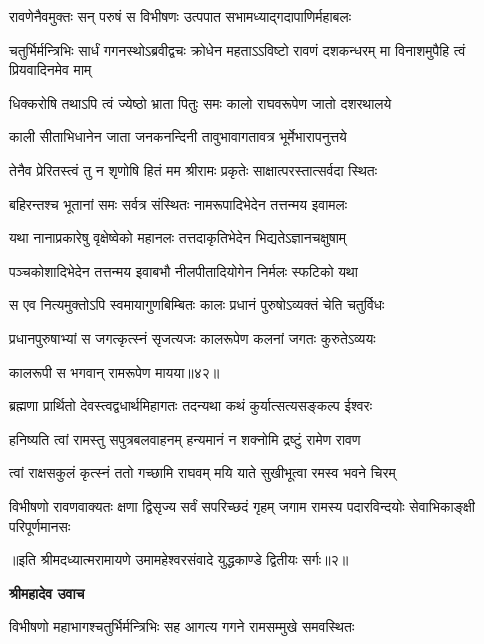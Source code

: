 \twolineshloka
{रावणेनैवमुक्तः सन् परुषं स विभीषणः}
{उत्पपात सभामध्याद्गदापाणिर्महाबलः} %

\threelineshloka
{चतुर्भिर्मन्त्रिभिः सार्धं गगनस्थोऽब्रवीद्वचः}
{क्रोधेन महताऽऽविष्टो रावणं दशकन्धरम्}
{मा विनाशमुपैहि त्वं प्रियवादिनमेव माम्} %

\twolineshloka
{धिक्करोषि तथाऽपि त्वं ज्येष्ठो भ्राता पितुः समः}
{कालो राघवरूपेण जातो दशरथालये} %

\twolineshloka
{काली सीताभिधानेन जाता जनकनन्दिनी}
{तावुभावागतावत्र भूर्मेभारापनुत्तये} %

\twolineshloka
{तेनैव प्रेरितस्त्वं तु न शृणोषि हितं मम}
{श्रीरामः प्रकृतेः साक्षात्परस्तात्सर्वदा स्थितः} %

\twolineshloka
{बहिरन्तश्च भूतानां समः सर्वत्र संस्थितः}
{नामरूपादिभेदेन तत्तन्मय इवामलः} %

\twolineshloka
{यथा नानाप्रकारेषु वृक्षेष्वेको महानलः}
{तत्तदाकृतिभेदेन भिद्यतेऽज्ञानचक्षुषाम्} %

\twolineshloka
{पञ्चकोशादिभेदेन तत्तन्मय इवाबभौ}
{नीलपीतादियोगेन निर्मलः स्फटिको यथा} %

\twolineshloka
{स एव नित्यमुक्तोऽपि स्वमायागुणबिम्बितः}
{कालः प्रधानं पुरुषोऽव्यक्तं चेति चतुर्विधः} %

\twolineshloka
{प्रधानपुरुषाभ्यां स जगत्कृत्स्नं सृजत्यजः}
{कालरूपेण कलनां जगतः कुरुतेऽव्ययः} %

{कालरूपी स भगवान् रामरूपेण मायया॥४२॥} %


\twolineshloka
{ब्रह्मणा प्रार्थितो देवस्त्वद्वधार्थमिहागतः}
{तदन्यथा कथं कुर्यात्सत्यसङ्कल्प ईश्वरः} %

\twolineshloka
{हनिष्यति त्वां रामस्तु सपुत्रबलवाहनम्}
{हन्यमानं न शक्नोमि द्रष्टुं रामेण रावण} %

\twolineshloka
{त्वां राक्षसकुलं कृत्स्नं ततो गच्छामि राघवम्}
{मयि याते सुखीभूत्वा रमस्व भवने चिरम्} %

\fourlineindentedshloka
{विभीषणो रावणवाक्यतः क्षणा\-}
{द्विसृज्य सर्वं सपरिच्छदं गृहम्}
{जगाम रामस्य पदारविन्दयोः}
{सेवाभिकाङ्क्षी परिपूर्णमानसः} %

{॥इति श्रीमदध्यात्मरामायणे उमामहेश्वरसंवादे युद्धकाण्डे द्वितीयः
सर्गः॥२॥
}




\textbf{श्रीमहादेव उवाच}

\twolineshloka
{विभीषणो महाभागश्चतुर्भिर्मन्त्रिभिः सह}
{आगत्य गगने रामसम्मुखे समवस्थितः} %

